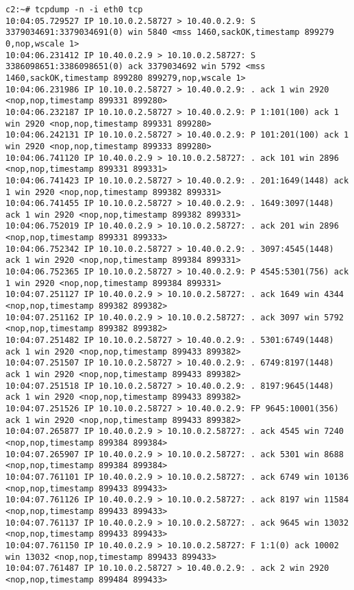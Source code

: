 \documentclass[a4paper,12pt]{article}
\begin{document}
\begin{lstlisting}
c2:~# tcpdump -n -i eth0 tcp
10:04:05.729527 IP 10.10.0.2.58727 > 10.40.0.2.9: S 3379034691:3379034691(0) win 5840 <mss 1460,sackOK,timestamp 899279 0,nop,wscale 1>
10:04:06.231412 IP 10.40.0.2.9 > 10.10.0.2.58727: S 3386098651:3386098651(0) ack 3379034692 win 5792 <mss 1460,sackOK,timestamp 899280 899279,nop,wscale 1>
10:04:06.231986 IP 10.10.0.2.58727 > 10.40.0.2.9: . ack 1 win 2920 <nop,nop,timestamp 899331 899280>
10:04:06.232187 IP 10.10.0.2.58727 > 10.40.0.2.9: P 1:101(100) ack 1 win 2920 <nop,nop,timestamp 899331 899280>
10:04:06.242131 IP 10.10.0.2.58727 > 10.40.0.2.9: P 101:201(100) ack 1 win 2920 <nop,nop,timestamp 899333 899280>
10:04:06.741120 IP 10.40.0.2.9 > 10.10.0.2.58727: . ack 101 win 2896 <nop,nop,timestamp 899331 899331>
10:04:06.741423 IP 10.10.0.2.58727 > 10.40.0.2.9: . 201:1649(1448) ack 1 win 2920 <nop,nop,timestamp 899382 899331>
10:04:06.741455 IP 10.10.0.2.58727 > 10.40.0.2.9: . 1649:3097(1448) ack 1 win 2920 <nop,nop,timestamp 899382 899331>
10:04:06.752019 IP 10.40.0.2.9 > 10.10.0.2.58727: . ack 201 win 2896 <nop,nop,timestamp 899331 899333>
10:04:06.752342 IP 10.10.0.2.58727 > 10.40.0.2.9: . 3097:4545(1448) ack 1 win 2920 <nop,nop,timestamp 899384 899331>
10:04:06.752365 IP 10.10.0.2.58727 > 10.40.0.2.9: P 4545:5301(756) ack 1 win 2920 <nop,nop,timestamp 899384 899331>
10:04:07.251127 IP 10.40.0.2.9 > 10.10.0.2.58727: . ack 1649 win 4344 <nop,nop,timestamp 899382 899382>
10:04:07.251162 IP 10.40.0.2.9 > 10.10.0.2.58727: . ack 3097 win 5792 <nop,nop,timestamp 899382 899382>
10:04:07.251482 IP 10.10.0.2.58727 > 10.40.0.2.9: . 5301:6749(1448) ack 1 win 2920 <nop,nop,timestamp 899433 899382>
10:04:07.251507 IP 10.10.0.2.58727 > 10.40.0.2.9: . 6749:8197(1448) ack 1 win 2920 <nop,nop,timestamp 899433 899382>
10:04:07.251518 IP 10.10.0.2.58727 > 10.40.0.2.9: . 8197:9645(1448) ack 1 win 2920 <nop,nop,timestamp 899433 899382>
10:04:07.251526 IP 10.10.0.2.58727 > 10.40.0.2.9: FP 9645:10001(356) ack 1 win 2920 <nop,nop,timestamp 899433 899382>
10:04:07.265877 IP 10.40.0.2.9 > 10.10.0.2.58727: . ack 4545 win 7240 <nop,nop,timestamp 899384 899384>
10:04:07.265907 IP 10.40.0.2.9 > 10.10.0.2.58727: . ack 5301 win 8688 <nop,nop,timestamp 899384 899384>
10:04:07.761101 IP 10.40.0.2.9 > 10.10.0.2.58727: . ack 6749 win 10136 <nop,nop,timestamp 899433 899433>
10:04:07.761126 IP 10.40.0.2.9 > 10.10.0.2.58727: . ack 8197 win 11584 <nop,nop,timestamp 899433 899433>
10:04:07.761137 IP 10.40.0.2.9 > 10.10.0.2.58727: . ack 9645 win 13032 <nop,nop,timestamp 899433 899433>
10:04:07.761150 IP 10.40.0.2.9 > 10.10.0.2.58727: F 1:1(0) ack 10002 win 13032 <nop,nop,timestamp 899433 899433>
10:04:07.761487 IP 10.10.0.2.58727 > 10.40.0.2.9: . ack 2 win 2920 <nop,nop,timestamp 899484 899433>
\end{lstlisting}
\end{document}
